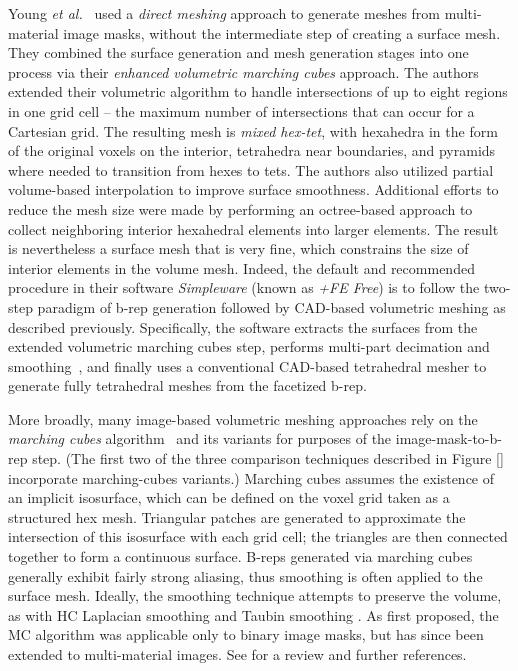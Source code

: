 Young \textit{et al.}~\cite{young_2008} used a \textit{direct meshing} approach to generate meshes from multi-material image masks, without the intermediate step of creating a surface mesh. They combined the surface generation and mesh generation stages into one process via their \textit{enhanced volumetric marching cubes} approach.  The authors extended their volumetric algorithm to handle intersections of up to eight regions in one grid cell -- the maximum number of intersections that can occur for a Cartesian grid.  The resulting mesh is \textit{mixed hex-tet}, with hexahedra in the form of the original voxels on the interior, tetrahedra near boundaries, and pyramids where needed to transition from hexes to tets. The authors also utilized partial volume-based interpolation to improve surface smoothness. Additional efforts to reduce the mesh size were made by performing an octree-based approach to collect neighboring interior hexahedral elements into larger elements.  The result is nevertheless a surface mesh that is very fine, which constrains the size of interior elements in the volume mesh.  Indeed, the default and recommended procedure in their software \textit{Simpleware} (known as \textit{+FE Free}) is to follow the two-step paradigm of b-rep generation followed by CAD-based volumetric meshing as described previously. Specifically, the software extracts the surfaces from the extended volumetric marching cubes step, performs multi-part decimation and smoothing~\cite{egst}, and finally uses a conventional CAD-based tetrahedral mesher to generate fully tetrahedral meshes from the facetized b-rep.

More broadly, many image-based volumetric meshing approaches rely on the \textit{marching cubes} algorithm~\cite{lorensen_1987} and its variants for purposes of the image-mask-to-b-rep step.  (The first two of the three comparison techniques described in Figure \ref{} incorporate marching-cubes variants.)  Marching cubes assumes the existence of an implicit isosurface, which can be defined on the voxel grid taken as a structured hex mesh.  Triangular patches are generated to approximate the intersection of this isosurface with each grid cell; the triangles are then connected together to form a continuous surface. B-reps generated via marching cubes generally exhibit fairly strong aliasing, thus smoothing is often applied to the surface mesh.  Ideally, the smoothing technique attempts to preserve the volume, as with HC Laplacian smoothing\cite{vollmer_1999} and Taubin smoothing \cite{taubin1995signal, taubin_1995}.  As first proposed, the MC algorithm was applicable only to binary image masks, but has since been extended to multi-material images.  See \cite{} for a review and further references.

